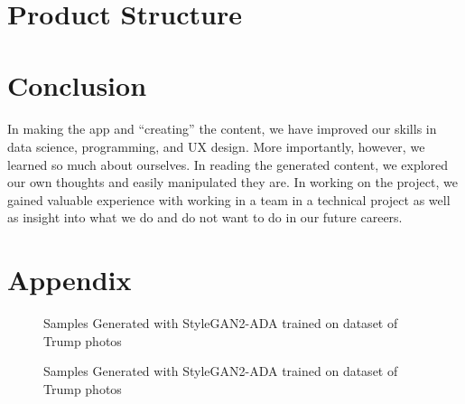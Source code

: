 \documentclass[12pt, letterpaper]{article}
\begin{document}
\section{Product Structure} 

\section{Conclusion}

\paragraph{}In making the app and “creating” the content, we have improved our skills in data science, programming, and UX design. More importantly, however, we learned so much about ourselves. In reading the generated content, we explored our own thoughts and easily manipulated they are. In working on the project, we gained valuable experience with working in a team in a technical project as well as insight into what we do and do not want to do in our future careers.

\section*{Appendix}

\begin{figure}[h]
	\begin{center}
    	\qquad
    	\qquad
    	\qquad
	\end{center}
      
    \caption{Samples Generated with StyleGAN2-ADA trained on dataset of Trump photos}
    \label{trump}
    
\end{figure}

\begin{figure}[h]
	\begin{center}
    	\qquad
    	\qquad
    	\qquad
    	\qquad
	\end{center}
      
    \caption{Samples Generated with StyleGAN2-ADA trained on dataset of Trump photos}
    \label{trump}
    
\end{figure}
\end{document}
